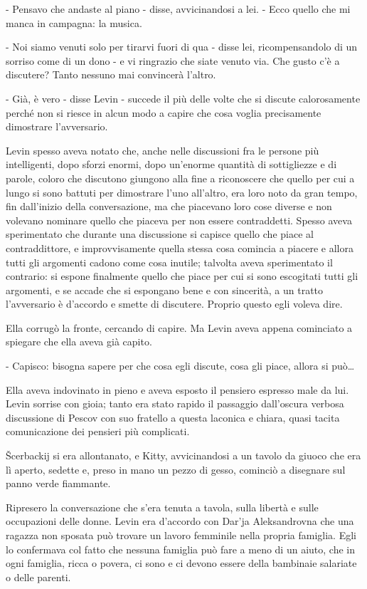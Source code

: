 - Pensavo che andaste al piano - disse, avvicinandosi a lei. - Ecco quello che mi manca in campagna: la musica. 

- Noi siamo venuti solo per tirarvi fuori di qua - disse lei, ricompensandolo di un sorriso come di un dono - e vi ringrazio che siate venuto via. Che gusto c'è a discutere? Tanto nessuno mai convincerà l'altro. 

- Già, è vero - disse Levin - succede il più delle volte che si discute calorosamente perché non si riesce in alcun modo a capire che cosa voglia precisamente dimostrare l'avversario. 

Levin spesso aveva notato che, anche nelle discussioni fra le persone più intelligenti, dopo sforzi enormi, dopo un'enorme quantità di sottigliezze e di parole, coloro che discutono giungono alla fine a riconoscere che quello per cui a lungo si sono battuti per dimostrare l'uno all'altro, era loro noto da gran tempo, fin dall'inizio della conversazione, ma che piacevano loro cose diverse e non volevano nominare quello che piaceva per non essere contraddetti. Spesso aveva sperimentato che durante una discussione si capisce quello che piace al contraddittore, e improvvisamente quella stessa cosa comincia a piacere e allora tutti gli argomenti cadono come cosa inutile; talvolta aveva sperimentato il contrario: si espone finalmente quello che piace per cui si sono escogitati tutti gli argomenti, e se accade che si espongano bene e con sincerità, a un tratto l'avversario è d'accordo e smette di discutere. Proprio questo egli voleva dire. 

Ella corrugò la fronte, cercando di capire. Ma Levin aveva appena cominciato a spiegare che ella aveva già capito. 

- Capisco: bisogna sapere per che cosa egli discute, cosa gli piace, allora si può\ldots{} 

Ella aveva indovinato in pieno e aveva esposto il pensiero espresso male da lui. Levin sorrise con gioia; tanto era stato rapido il passaggio dall'oscura verbosa discussione di Pescov con suo fratello a questa laconica e chiara, quasi tacita comunicazione dei pensieri più complicati. 

Šcerbackij si era allontanato, e Kitty, avvicinandosi a un tavolo da giuoco che era lì aperto, sedette e, preso in mano un pezzo di gesso, cominciò a disegnare sul panno verde fiammante. 

Ripresero la conversazione che s'era tenuta a tavola, sulla libertà e sulle occupazioni delle donne. Levin era d'accordo con Dar'ja Aleksandrovna che una ragazza non sposata può trovare un lavoro femminile nella propria famiglia. Egli lo confermava col fatto che nessuna famiglia può fare a meno di un aiuto, che in ogni famiglia, ricca o povera, ci sono e ci devono essere della bambinaie salariate o delle parenti. 

